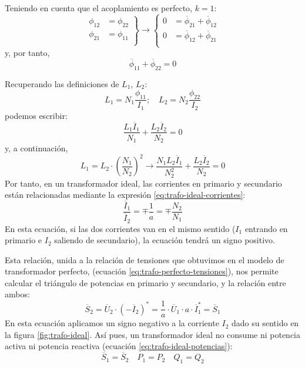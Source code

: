 Teniendo en cuenta que el acoplamiento es perfecto, $k = 1$:
  \[
    \left.
      \begin{array}{ll}
      \phi_{12} &= \phi_{22}\\
      \phi_{21} &= \phi_{11}\\
    \end{array} \right\} 
       \rightarrow
       \left\{
    \begin{array}{ll}
      0 &= \overline{\phi}_{21} + \overline{\phi}_{12}\\
      0 &= \overline{\phi}_{12} + \overline{\phi}_{21}\\
    \end{array}\right.
\]
y, por tanto,
\[
  \overline{\phi}_{11} + \overline{\phi}_{22} = 0
\]

Recuperando las definiciones de $L_1$, $L_2$:
  \[
    L_1 = N_1 \frac{\phi_{11}}{I_1}; \quad L_2 = N_2
    \frac{\phi_{22}}{I_2}
  \]
podemos escribir:
\[
  \frac{L_1 \overline{I}_1}{N_1} + \frac{L_2 \overline{I}_2}{N_2}
  = 0
\]
y, a continuación,
\[
    L_1 = L_2 \cdot \left(\frac{N_1}{N_2}\right)^2 \rightarrow
    \frac{N_1L_2 \overline{I}_1}{N^2_2} + \frac{L_2
      \overline{I}_2}{N_2} = 0
  \]
Por tanto, en un transformador ideal, las corrientes en primario y secundario están relacionadas mediante la expresión \ref{eq:trafo-ideal-corrientes}:
\begin{equation}
  \label{eq:trafo-ideal-corrientes}
  \boxed{\frac{\overline{I}_1}{\overline{I}_2} = \mp \frac{1}{a} =
    \mp \frac{N_2}{N_1}}
\end{equation}
En esta ecuación, si las dos corrientes van en el mismo sentido ($I_1$ entrando en primario e $I_2$ saliendo de secundario), la ecuación tendrá un signo positivo.

Esta relación, unida a la relación de tensiones que obtuvimos en el modelo de transformador perfecto, (ecuación \ref{eq:trafo-perfecto-tensiones}), nos permite calcular el triángulo de potencias en primario y secundario, y la relación entre ambos:
\[
  \overline{S}_2 = \overline{U}_2 \cdot (-\overline{I}_2)^* = \frac{1}{a} \cdot
  \overline{U}_1 \cdot a \cdot \overline{I}_1^* = \overline{S}_1
  \]
En esta ecuación aplicamos un signo negativo a la corriente $I_2$ dado su sentido en la figura \ref{fig:trafo-ideal}. Así pues, un transformador ideal no consume ni potencia activa ni potencia reactiva (ecuación \ref{eq:trafo-ideal-potencias}):
\begin{equation}
  \label{eq:trafo-ideal-potencias}
  \boxed{\overline{S}_1 = \overline{S}_2} \quad \boxed{P_1 = P_2}
  \quad \boxed{Q_1 = Q_2}
  \end{equation}

